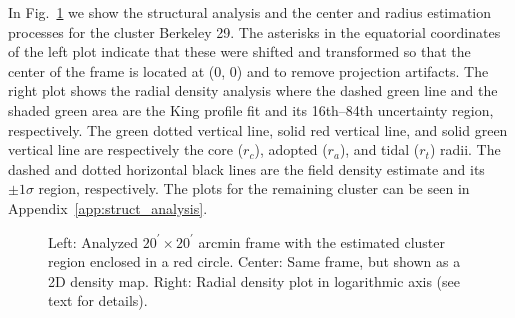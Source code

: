 \documentclass{aa}
\begin{document}
  In Fig.~\ref{fig:BER29_struct} we show the structural analysis and  the center and
  radius estimation processes for the cluster Berkeley 29. The asterisks in the
  equatorial coordinates of the left plot indicate that these were shifted
  and transformed so that the center of the frame is located at (0, 0) and to
  remove projection artifacts. The right plot shows the radial density analysis
  where the dashed green line and the shaded green area are the King profile fit
  and its 16th--84th uncertainty region, respectively. The green dotted vertical
  line, solid red vertical line, and solid green vertical line are respectively the core 
  ($r_{c}$), adopted ($r_{a}$), and tidal ($r_{t}$) radii. The
  dashed and dotted horizontal black lines are the field density estimate and
  its $\pm1\sigma$ region, respectively. The plots for the remaining cluster can
  be seen in Appendix~\ref{app:struct_analysis}.

  \begin{figure}
   \caption{Left: Analyzed $20^{\prime} \times 20^{\prime}$ arcmin frame with the
   estimated cluster region enclosed in a red circle. Center: Same frame, but
   shown as a 2D density map. Right: Radial density plot in
   logarithmic axis (see text for details).}
   \label{fig:BER29_struct}
  \end{figure}
\end{document}
